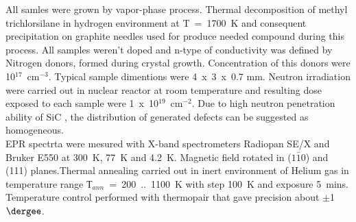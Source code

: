 All samles were grown by vapor-phase process.  Thermal decomposition of methyl trichlorsilane in hydrogen environment at T~=~1700~K and consequent precipitation on graphite needles used for produce needed compound during this process. All samples weren't doped and n-type of conductivity was defined by Nitrogen donors, formed during crystal growth. Concentration of this donors were 10$^{17}$~cm$^{-3}$. Typical sample dimentions were 4~x~3~x~0.7 mm. Neutron irradiation were carried out in nuclear reactor at room temperature and resulting dose exposed to each sample were 1~x~10$^{19}$~cm$^{-2}$. Due to high neutron penetration ability of SiC \citep{neut}, the distribution of generated defects can be suggested as homogeneous.\\
\indent EPR spectrta were mesured with X-band spectrometers Radiopan SE/X and Bruker E550 at 300~K, 77~K and 4.2~K. Magnetic field rotated in ($1\bar{1}0$) and (111) planes.Thermal annealing carried out in inert environment of Helium gas in temperature range Т$_{ann}$~=~200~..~1100~K with step 100~K and exposure 5~mins. Temperature control performed with thermopair that gave precision about $\pm$1$\dergee$.
